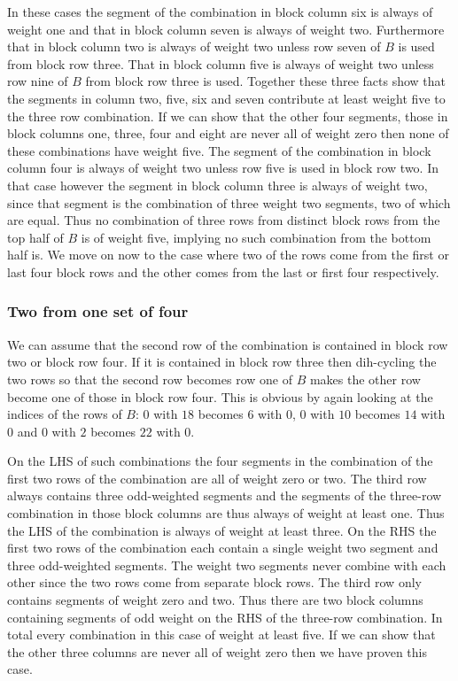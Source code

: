 In these cases the segment of the combination in block column six is always of weight one and that in block column seven is always of weight two.
Furthermore that in block column two is always of weight two unless row seven of $B$ is used from block row three.
That in block column five is always of weight two unless row nine of $B$ from block row three is used.
Together these three facts show that the segments in column two, five, six and seven contribute at least weight five to the three row combination.
If we can show that the other four segments, those in block columns one, three, four and eight are never all of weight zero then none of these combinations have weight five.
The segment of the combination in block column four is always of weight two unless row five is used in block row two.
In that case however the segment in block column three is always of weight two, since that segment is the combination of three weight two segments, two of which are equal.
Thus no combination of three rows from distinct block rows from the top half of $B$ is of weight five, implying no such combination from the bottom half is.
We move on now to the case where two of the rows come from the first or last four block rows and the other comes from the last or first four respectively.


\subsubsection{Two from one set of four}
We can assume that the second row of the combination is contained in block row two or block row four.
If it is contained in block row three then dih-cycling the two rows so that the second row becomes row one of $B$ makes the other row become one of those in block row four.
This is obvious by again looking at the indices of the rows of $B$: $0$ with $18$ becomes $6$ with $0$, $0$ with $10$ becomes $14$ with $0$ and $0$ with $2$ becomes $22$ with $0$.

On the LHS of such combinations the four segments in the combination of the first two rows of the combination are all of weight zero or two.
The third row always contains three odd-weighted segments and the segments of the three-row combination in those block columns are thus always of weight at least one.
Thus the LHS of the combination is always of weight at least three.
On the RHS the first two rows of the combination each contain a single weight two segment and three odd-weighted segments.
The weight two segments never combine with each other since the two rows come from separate block rows.
The third row only contains segments of weight zero and two.
Thus there are two block columns containing segments of odd weight on the RHS of the three-row combination.
In total every combination in this case of weight at least five.
If we can show that the other three columns are never all of weight zero then we have proven this case.

